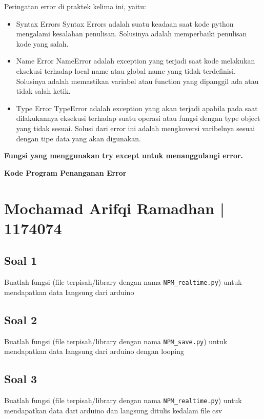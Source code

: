 Peringatan error di praktek kelima ini, yaitu:
\begin{itemize}
	\item Syntax Errors
	Syntax Errors adalah suatu keadaan saat kode python mengalami kesalahan penulisan. Solusinya adalah memperbaiki penulisan kode yang salah.

	\item Name Error
	NameError adalah exception yang terjadi saat kode melakukan eksekusi terhadap local name atau global name yang tidak terdefinisi. Solusinya adalah memastikan variabel atau function yang dipanggil ada atau tidak salah ketik.

	\item Type Error
	TypeError adalah exception yang akan terjadi apabila pada saat dilakukannya eksekusi terhadap suatu operasi atau fungsi dengan type object yang tidak sesuai. Solusi dari error ini adalah mengkoversi varibelnya sesuai dengan tipe data yang akan digunakan.
\end{itemize}

\textbf{Fungsi yang menggunakan try except untuk menanggulangi error.}



\textbf{Kode Program Penanganan Error}
\section{Mochamad Arifqi Ramadhan | 1174074}
\subsection{Soal 1}
Buatlah fungsi (file terpisah/library dengan nama \verb|NPM_realtime.py|) untuk mendapatkan data langsung dari arduino




\subsection{Soal 2}
Buatlah fungsi (file terpisah/library dengan nama \verb|NPM_save.py|) untuk mendapatkan data langsung dari arduino dengan looping




\subsection{Soal 3}
Buatlah fungsi (file terpisah/library dengan nama \verb|NPM_realtime.py|) untuk mendapatkan data dari arduino dan langsung ditulis kedalam file csv





